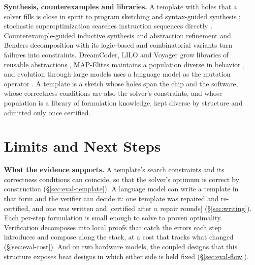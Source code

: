 \documentclass[11pt]{article}
\newcommand{\pending}[1]{\textcolor{red!65!black}{[#1]}}
\begin{document}
\textbf{Synthesis, counterexamples and libraries.} A template with holes that a solver fills is close in spirit to program sketching \cite{r64} and syntax-guided synthesis \cite{r61}; stochastic superoptimization searches instruction sequences directly \cite{r62}. Counterexample-guided inductive synthesis and abstraction refinement \cite{r64,r63} and Benders decomposition with its logic-based and combinatorial variants \cite{r65,r66,r67} turn failures into constraints. DreamCoder, LILO and Voyager grow libraries of reusable abstractions \cite{r68,r69,r70}, MAP-Elites maintains a population diverse in behavior \cite{r71}, and evolution through large models uses a language model as the mutation operator \cite{r72}. A template is a sketch whose holes span the chip and the software, whose correctness conditions are also the solver's constraints, and whose population is a library of formulation knowledge, kept diverse by structure and admitted only once certified.

\section{Limits and Next Steps}\label{sec:limits}

\textbf{What the evidence supports.} A template's search constraints and its correctness conditions can coincide, so that the solver's optimum is correct by construction (§\ref{sec:eval-template}). A language model can write a template in that form and the verifier can decide it: one template was repaired and re-certified, and one was written and \pending{certified after \(n\) repair rounds} (§\ref{sec:writing}). Each per-step formulation is small enough to solve to proven optimality. Verification decomposes into local proofs that catch the errors each step introduces and compose along the stack, at a cost that tracks what changed (§\ref{sec:eval-cost}). And on two hardware models, the coupled designs that this structure exposes beat designs in which either side is held fixed (§\ref{sec:eval-flow}).
\end{document}
